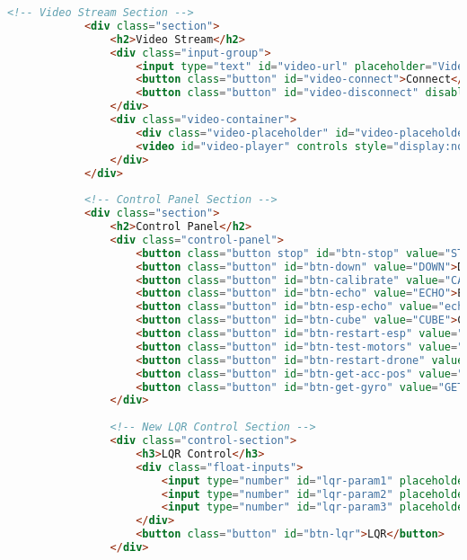 \begin{lstlisting}[language=html]
            <!-- Video Stream Section -->
            <div class="section">
                <h2>Video Stream</h2>
                <div class="input-group">
                    <input type="text" id="video-url" placeholder="Video Stream URL (LL-HLS)" value="https://cdnapi.kaltura.com/p/1645161/sp/164516100/playManifest/entryId/1_szwkpcvd/format/applehttp/protocol/https/flavorIds/1_1xdbzoa6,1_owqdr9ag/a.m3u8">
                    <button class="button" id="video-connect">Connect</button>
                    <button class="button" id="video-disconnect" disabled>Disconnect</button>
                </div>
                <div class="video-container">
                    <div class="video-placeholder" id="video-placeholder">Video stream not connected</div>
                    <video id="video-player" controls style="display:none;"></video>
                </div>
            </div>
    
            <!-- Control Panel Section -->
            <div class="section">
                <h2>Control Panel</h2>
                <div class="control-panel">
                    <button class="button stop" id="btn-stop" value="STOP">STOP</button>
                    <button class="button" id="btn-down" value="DOWN">DOWN</button>
                    <button class="button" id="btn-calibrate" value="CALB">CALIBRATE</button>
                    <button class="button" id="btn-echo" value="ECHO">ECHO</button>
                    <button class="button" id="btn-esp-echo" value="echo">ESP-ECHO</button>
                    <button class="button" id="btn-cube" value="CUBE">CUBE</button>
                    <button class="button" id="btn-restart-esp" value="RESTART">RESTART-ESP</button>
                    <button class="button" id="btn-test-motors" value="TEST-M">TEST-MOTORS</button>
                    <button class="button" id="btn-restart-drone" value="REBOOT">RESTART DRONE</button>
                    <button class="button" id="btn-get-acc-pos" value="GET_ACC-POS">GET-ACC-POS</button>
                    <button class="button" id="btn-get-gyro" value="GET_GYRO">GET-GYRO</button>
                </div>
                
                <!-- New LQR Control Section -->
                <div class="control-section">
                    <h3>LQR Control</h3>
                    <div class="float-inputs">
                        <input type="number" id="lqr-param1" placeholder="Param 1" step="0.1">
                        <input type="number" id="lqr-param2" placeholder="Param 2" step="0.1">
                        <input type="number" id="lqr-param3" placeholder="Param 3" step="0.1">
                    </div>
                    <button class="button" id="btn-lqr">LQR</button>
                </div>
                

\end{lstlisting}
